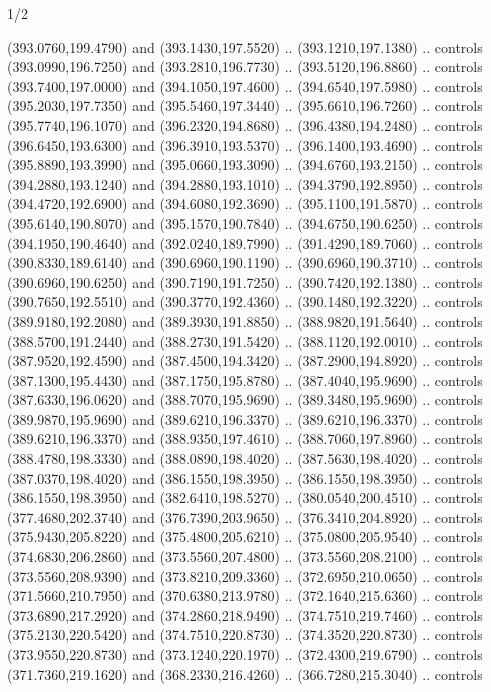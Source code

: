 \begin{flagdescription}{1/2}
\begin{scope}[xshift=0.5\flaglength]
\begin{scope}[scale=0.004\flagwidth,xshift=-90mm,yshift=89mm]
\begin{scope}[y=0.80pt, x=0.80pt, yscale=-1, xscale=1, inner sep=0pt, outer sep=0pt]
  (393.0760,199.4790) and (393.1430,197.5520) .. (393.1210,197.1380) .. controls
  (393.0990,196.7250) and (393.2810,196.7730) .. (393.5120,196.8860) .. controls
  (393.7400,197.0000) and (394.1050,197.4600) .. (394.6540,197.5980) .. controls
  (395.2030,197.7350) and (395.5460,197.3440) .. (395.6610,196.7260) .. controls
  (395.7740,196.1070) and (396.2320,194.8680) .. (396.4380,194.2480) .. controls
  (396.6450,193.6300) and (396.3910,193.5370) .. (396.1400,193.4690) .. controls
  (395.8890,193.3990) and (395.0660,193.3090) .. (394.6760,193.2150) .. controls
  (394.2880,193.1240) and (394.2880,193.1010) .. (394.3790,192.8950) .. controls
  (394.4720,192.6900) and (394.6080,192.3690) .. (395.1100,191.5870) .. controls
  (395.6140,190.8070) and (395.1570,190.7840) .. (394.6750,190.6250) .. controls
  (394.1950,190.4640) and (392.0240,189.7990) .. (391.4290,189.7060) .. controls
  (390.8330,189.6140) and (390.6960,190.1190) .. (390.6960,190.3710) .. controls
  (390.6960,190.6250) and (390.7190,191.7250) .. (390.7420,192.1380) .. controls
  (390.7650,192.5510) and (390.3770,192.4360) .. (390.1480,192.3220) .. controls
  (389.9180,192.2080) and (389.3930,191.8850) .. (388.9820,191.5640) .. controls
  (388.5700,191.2440) and (388.2730,191.5420) .. (388.1120,192.0010) .. controls
  (387.9520,192.4590) and (387.4500,194.3420) .. (387.2900,194.8920) .. controls
  (387.1300,195.4430) and (387.1750,195.8780) .. (387.4040,195.9690) .. controls
  (387.6330,196.0620) and (388.7070,195.9690) .. (389.3480,195.9690) .. controls
  (389.9870,195.9690) and (389.6210,196.3370) .. (389.6210,196.3370) .. controls
  (389.6210,196.3370) and (388.9350,197.4610) .. (388.7060,197.8960) .. controls
  (388.4780,198.3330) and (388.0890,198.4020) .. (387.5630,198.4020) .. controls
  (387.0370,198.4020) and (386.1550,198.3950) .. (386.1550,198.3950) .. controls
  (386.1550,198.3950) and (382.6410,198.5270) .. (380.0540,200.4510) .. controls
  (377.4680,202.3740) and (376.7390,203.9650) .. (376.3410,204.8920) .. controls
  (375.9430,205.8220) and (375.4800,205.6210) .. (375.0800,205.9540) .. controls
  (374.6830,206.2860) and (373.5560,207.4800) .. (373.5560,208.2100) .. controls
  (373.5560,208.9390) and (373.8210,209.3360) .. (372.6950,210.0650) .. controls
  (371.5660,210.7950) and (370.6380,213.9780) .. (372.1640,215.6360) .. controls
  (373.6890,217.2920) and (374.2860,218.9490) .. (374.7510,219.7460) .. controls
  (375.2130,220.5420) and (374.7510,220.8730) .. (374.3520,220.8730) .. controls
  (373.9550,220.8730) and (373.1240,220.1970) .. (372.4300,219.6790) .. controls
  (371.7360,219.1620) and (368.2330,216.4260) .. (366.7280,215.3040) .. controls

\end{scope}
\end{scope}
\end{scope}
\end{flagdescription}
